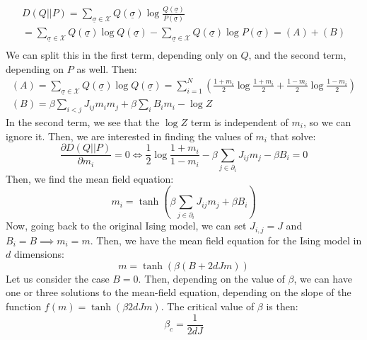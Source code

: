 \begin{equation}
    \begin{gathered}
        D(Q||P) = \sum_{\underline{\sigma}\in\mathcal{X}}Q(\underline{\sigma})\log\frac{Q(\underline{\sigma})}{P(\underline{\sigma})}\\
        =\sum_{\underline{\sigma}\in\mathcal{X}}Q(\underline{\sigma})\log Q(\underline{\sigma}) - \sum_{\underline{\sigma}\in\mathcal{X}}Q(\underline{\sigma})\log P(\underline{\sigma}) = (A) + (B)\\
    \end{gathered}
\end{equation}
We can split this in the first term, depending only on $Q$, and the second term, depending on $P$ as well. Then:
\begin{equation}
    \begin{gathered}
        (A) = \sum_{\underline{\sigma}\in\mathcal{X}}Q(\underline{\sigma})\log Q(\underline{\sigma}) = \sum_{i=1}^{N}\left(\frac{1+m_i}{2} \log \frac{1+m_i}{2}+\frac{1-m_i}{2} \log \frac{1-m_i}{2}\right)\\
        (B) = \beta \sum_{i<j} J_{i j} m_i m_j + \beta \sum_i B_i m_i-\log Z
    \end{gathered}
\end{equation}
In the second term, we see that the $\log Z$ term is independent of $m_i$, so we can ignore it. Then, we are interested in finding the values of $m_i$ that solve:
\begin{equation}
    \frac{\partial D(Q||P)}{\partial m_i} = 0 \iff \frac{1}{2} \log \frac{1+m_i}{1-m_i} - \beta \sum_{j\in \partial_i} J_{i j} m_j - \beta B_i = 0
\end{equation}
Then, we find the mean field equation:
\begin{equation}
    m_i = \tanh\left(\beta\sum_{j\in \partial_i} J_{i j} m_j + \beta B_i\right)
\end{equation}
Now, going back to the original Ising model, we can set $J_{i,j} = J$ and $B_i=B \implies m_i = m$. Then, we have the mean field equation for the Ising model in $d$ dimensions:
\begin{equation}
    m = \tanh(\beta (B + 2dJm))
\end{equation}
Let us consider the case $B=0$. Then, depending on the value of $\beta$, we can have one or three solutions to the mean-field equation, depending on the slope of the function $f(m) = \tanh(\beta 2dJm)$. The critical value of $\beta$ is then:
\begin{equation}
    \beta_c = \frac{1}{2dJ}
\end{equation}

